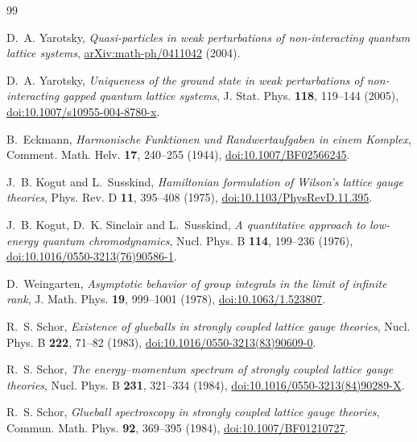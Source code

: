 \documentclass[11pt]{article}
\theoremstyle{plain}
\theoremstyle{definition}
\theoremstyle{remark}
\begin{document}
\begin{thebibliography}{99}\small\sloppy\raggedright

 D.~A. Yarotsky,
  \emph{Quasi-particles in weak perturbations of non-interacting quantum
  lattice systems},
  \href{https://arxiv.org/abs/math-ph/0411042}{arXiv:math-ph/0411042} (2004).

 D.~A. Yarotsky,
  \emph{Uniqueness of the ground state in weak perturbations of
  non-interacting gapped quantum lattice systems}, J. Stat. Phys.
  \textbf{118}, 119--144 (2005),
  \href{https://doi.org/10.1007/s10955-004-8780-x}{doi:10.1007/s10955-004-8780-x}.

 B.~Eckmann,
  \emph{Harmonische Funktionen und Randwertaufgaben in einem Komplex},
  Comment. Math. Helv. \textbf{17}, 240--255 (1944),
  \href{https://doi.org/10.1007/BF02566245}{doi:10.1007/BF02566245}.

 J.~B. Kogut and L.~Susskind,
  \emph{Hamiltonian formulation of Wilson's lattice gauge theories},
  Phys. Rev. D \textbf{11}, 395--408 (1975),
  \href{https://doi.org/10.1103/PhysRevD.11.395}{doi:10.1103/PhysRevD.11.395}.

 J.~B. Kogut, D.~K. Sinclair and L.~Susskind,
  \emph{A quantitative approach to low-energy quantum chromodynamics},
  Nucl. Phys. B \textbf{114}, 199--236 (1976),
  \href{https://doi.org/10.1016/0550-3213(76)90586-1}{doi:10.1016/0550-3213(76)90586-1}.

 D.~Weingarten,
  \emph{Asymptotic behavior of group integrals in the limit of infinite rank},
  J. Math. Phys. \textbf{19}, 999--1001 (1978),
  \href{https://doi.org/10.1063/1.523807}{doi:10.1063/1.523807}.

 R.~S. Schor,
  \emph{Existence of glueballs in strongly coupled lattice gauge theories},
  Nucl. Phys. B \textbf{222}, 71--82 (1983),
  \href{https://doi.org/10.1016/0550-3213(83)90609-0}{doi:10.1016/0550-3213(83)90609-0}.

 R.~S. Schor,
  \emph{The energy--momentum spectrum of strongly coupled lattice gauge
  theories}, Nucl. Phys. B \textbf{231}, 321--334 (1984),
  \href{https://doi.org/10.1016/0550-3213(84)90289-X}{doi:10.1016/0550-3213(84)90289-X}.

 R.~S. Schor,
  \emph{Glueball spectroscopy in strongly coupled lattice gauge theories},
  Commun. Math. Phys. \textbf{92}, 369--395 (1984),
  \href{https://doi.org/10.1007/BF01210727}{doi:10.1007/BF01210727}.


\end{thebibliography}
\end{document}
